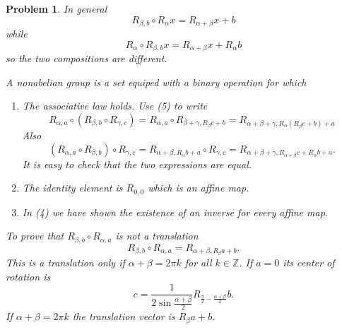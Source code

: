 \documentclass{article}
\newcommand{\Z}{\mathbb{Z}}
\theoremstyle{pprop}
\newtheorem{problem}{Problem}[section]
\begin{document}
\begin{problem}
In general 
\[
R_{\beta,b} \circ R_\alpha x = R_{\alpha+\beta}x + b 
\]
while 
\[
R_\alpha  \circ R_{\beta,b} x = R_{\alpha+\beta}x + R_\alpha b
\]
so the two compositions are different. 

A nonabelian group is a set equiped with a binary operation for 
which 
\begin{enumerate}[1.]
  \item The associative law holds. Use (5) to write 
  \[  
  R_{\alpha,a} \circ (R_{\beta,b} \circ R_{\gamma,c}) =
  R_{\alpha,a} \circ R_{\beta+\gamma,R_\beta c + b} = R_{\alpha+\beta+\gamma,R_{\alpha}(R_\beta c + b)+a}
  \]
  Also 
  \[  
  (R_{\alpha,a} \circ R_{\beta,b}) \circ R_{\gamma,c} =
  R_{\alpha+\beta,R_\alpha b+ a} \circ R_{\gamma,c} = R_{\alpha+\beta+\gamma,R_{\alpha+\beta}c+R_\alpha b+ a}.
  \]
  It is easy to check that the two expressions are equal.
  \item The identity element is $R_{0,0}$ which is an affine map. 
  \item In (4) we have shown the existence of an inverse for every affine map.
\end{enumerate}

To prove that $R_{\beta,b} \circ R_{\alpha,a}$ is not a translation
\[
R_{\beta,b} \circ R_{\alpha,a} = R_{\alpha+\beta,R_\beta a + b}.
\]
This is a translation only if $\alpha+\beta=2\pi k$ for all $k \in \Z$. If $a=0$ its center of rotation is 
\[
c = \frac{1}{2\sin \frac{\alpha+\beta}{2}} R_{\frac{\pi}{2}-\frac{\alpha+\beta}{2}} b.
\]
If $\alpha+\beta=2\pi k$ the translation vector is $R_\beta a + b$.
\end{problem}
\end{document}
